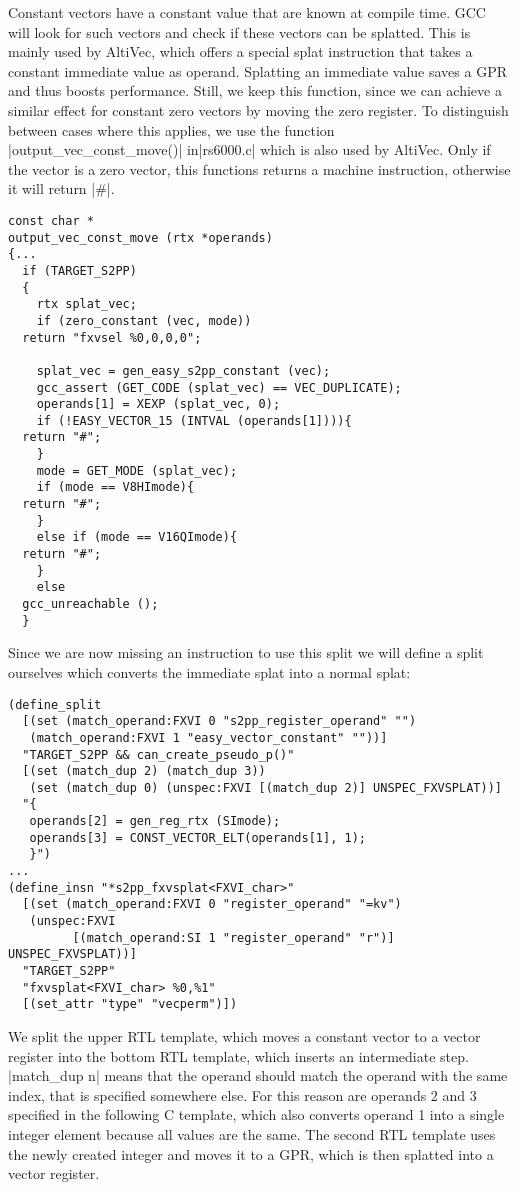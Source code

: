 Constant vectors have a constant value that are known at compile time.
\ac{GCC} will look for such vectors and check if these vectors can be splatted.
This is mainly used by AltiVec, which offers a special splat instruction that takes a constant immediate value as operand.
Splatting an immediate value saves a GPR and thus boosts performance.
Still, we keep this function, since we can achieve a similar effect for constant zero vectors by moving the zero register.
To distinguish between cases where this applies, we use the function |output_vec_const_move()| in|rs6000.c| which is also used by AltiVec.
Only if the vector is a zero vector, this functions returns a machine instruction, otherwise it will return |#|.
\begin{lstlisting}
const char *
output_vec_const_move (rtx *operands)
{...
  if (TARGET_S2PP)
  {
    rtx splat_vec;
    if (zero_constant (vec, mode))
  return "fxvsel %0,0,0,0";

    splat_vec = gen_easy_s2pp_constant (vec);
    gcc_assert (GET_CODE (splat_vec) == VEC_DUPLICATE);
    operands[1] = XEXP (splat_vec, 0);
    if (!EASY_VECTOR_15 (INTVAL (operands[1]))){
  return "#";
    }
    mode = GET_MODE (splat_vec);
    if (mode == V8HImode){
  return "#";
    }
    else if (mode == V16QImode){
  return "#";
    }
    else
  gcc_unreachable ();
  }
\end{lstlisting}

Since we are now missing an instruction to use this split we will define a split ourselves which converts the immediate splat into a normal splat:
\begin{lstlisting}
(define_split
  [(set (match_operand:FXVI 0 "s2pp_register_operand" "")
   (match_operand:FXVI 1 "easy_vector_constant" ""))]
  "TARGET_S2PP && can_create_pseudo_p()"
  [(set (match_dup 2) (match_dup 3))
   (set (match_dup 0) (unspec:FXVI [(match_dup 2)] UNSPEC_FXVSPLAT))]
  "{
   operands[2] = gen_reg_rtx (SImode);
   operands[3] = CONST_VECTOR_ELT(operands[1], 1);
   }")
...
(define_insn "*s2pp_fxvsplat<FXVI_char>"
  [(set (match_operand:FXVI 0 "register_operand" "=kv")
   (unspec:FXVI
         [(match_operand:SI 1 "register_operand" "r")] UNSPEC_FXVSPLAT))]
  "TARGET_S2PP"
  "fxvsplat<FXVI_char> %0,%1"
  [(set_attr "type" "vecperm")])
\end{lstlisting}

We split the upper \ac{RTL} template, which moves a constant vector to a vector register into the bottom \ac{RTL} template, which inserts an intermediate step.
|match_dup n| means that the operand should match the operand with the same index, that is specified somewhere else.
For this reason are operands 2 and 3 specified in the following C template, which also converts operand 1 into a single integer element because all values are the same.
The second \ac{RTL} template uses the newly created integer and moves it to a GPR, which is then splatted into a vector register.

